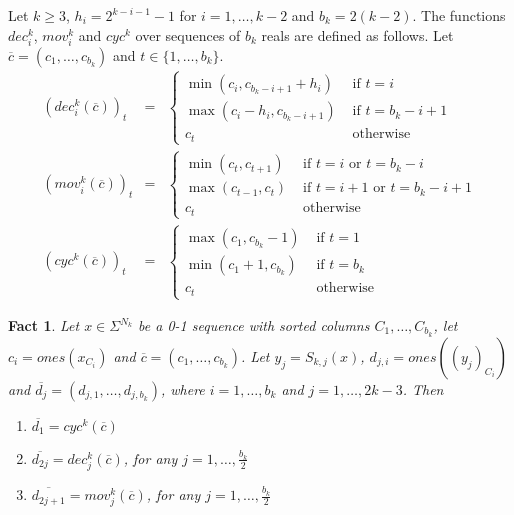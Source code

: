\documentclass{llncs}
\newtheorem{fact}[theorem]{Fact}
\begin{document}
\begin{definition} \label{defFun}
Let $k\ge 3$, $h_i=2^{k-i-1}-1$ for $i=1,\ldots,k-2$ and
$b_k=2(k-2)$. The functions $dec^k_i$, $mov^k_i$ and $cyc^k$ over
sequences of $b_k$ reals are defined as follows. Let
$\overline{c}=(c_1,\ldots,c_{b_k})$ and $t\in\{1,\ldots,b_k\}$.
\begin{eqnarray}
(dec^k_i(\overline{c}))_t &=& \left\{
\begin{array}{ll}
\min(c_i,c_{b_k-i+1}+h_i) & \mbox{ if } t=i\\
\max(c_i-h_i,c_{b_k-i+1}) & \mbox{ if } t=b_k-i+1\\
c_t                       & \mbox{ otherwise} 
\end{array}
\right.\\
(mov^k_i(\overline{c}))_t &=& \left\{
\begin{array}{ll}
\min(c_t,c_{t+1}) & \mbox{ if } t=i \mbox{ or } t=b_k-i\\
\max(c_{t-1},c_t) & \mbox{ if } t=i+1 \mbox{ or } t=b_k-i+1\\
c_t                       & \mbox{ otherwise} 
\end{array}
\right.\\
(cyc^k(\overline{c}))_t &=& \left\{
\begin{array}{ll}
\max(c_1,c_{b_k}-1) & \mbox{ if } t=1\\
\min(c_1+1,c_{b_k}) & \mbox{ if } t=b_k\\
c_t                       & \mbox{ otherwise} 
\end{array}
\right.
\end{eqnarray}
\end{definition}
\begin{fact} \label{f6}
Let $x\in\Sigma^{N_k}$ be a 0-1 sequence with sorted columns $C_1, \ldots,
  C_{b_k}$, let $c_i=ones(x_{C_i})$ and $\overline{c} =
  (c_1,\ldots,c_{b_k})$. Let $y_j=S_{k,j}(x)$, $d_{j,i}=ones((y_j)_{C_i})$
  and $\overline{d_j} =(d_{j,1},\ldots,d_{j,b_k})$, where
  $i=1,\ldots,b_k$ and $j=1,\ldots,2k-3$. Then
\begin{enumerate}
\item[(i)] $\overline{d_1} = cyc^k(\overline{c})$
\item[(ii)] $\overline{d_{2j}} = dec^k_j(\overline{c})$, for any
  $j=1,\ldots,\frac{b_k}{2}$
\item[(iii)] $\overline{d_{2j+1}} = mov^k_j(\overline{c})$, for any
  $j=1,\ldots,\frac{b_k}{2}$
\end{enumerate}
\end{fact}
\end{document}

